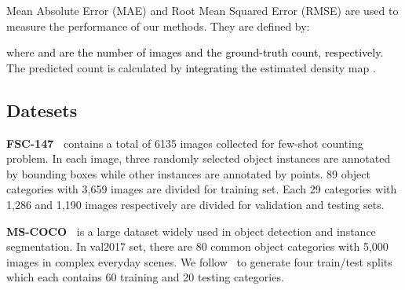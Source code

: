 \documentclass{article}
\newcommand\XP[1]{\textcolor{black}{#1}}\newcommand\XPC[1]{\textcolor{black}{[#1]}}
\begin{document}
Mean Absolute Error (MAE) and Root Mean Squared Error (RMSE) are used to measure the performance of our methods. They are defined by: 

where \XP{ and  are the number of images and the ground-truth count, respectively}. The predicted count  is calculated by \XP{integrating the} estimated density map .



\subsection{Datesets}
\noindent \textbf{FSC-147~\cite{ranjan2021learning}} contains a total of 6135 images collected for few-shot counting problem. In each image, three randomly selected object instances are annotated by bounding boxes while other instances are annotated by points. 89 object categories with 3,659 images are divided for training set. Each 29 categories with 1,286 and 1,190 images respectively are divided for validation and testing sets.


\noindent \textbf{MS-COCO~\cite{lin2014microsoft}} is a large dataset widely used in object detection and instance segmentation. In val2017 set, there are 80 common object categories with 5,000 images in complex everyday scenes. We follow~\cite{michaelis2018one} to generate four train/test splits which each contains 60 training and 20 testing categories.
\end{document}
